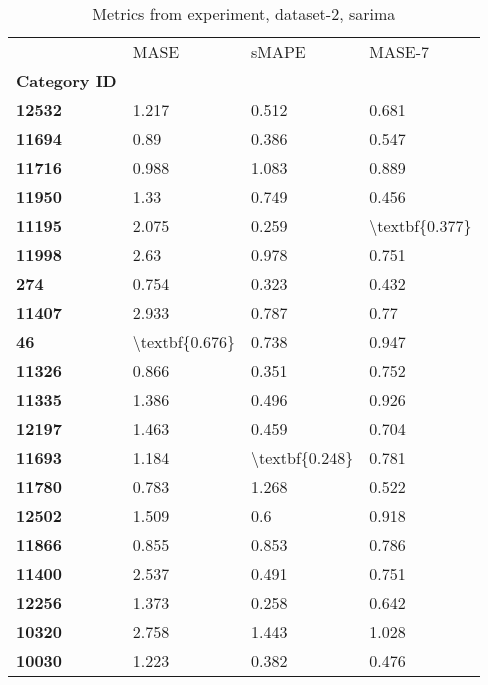 \begin{table}[h]
\centering
\caption{Metrics from experiment, dataset-2, sarima}
\label{table:sarima-dataset-2}
\begin{tabular}{llll}
\toprule
{} &            MASE &           sMAPE &          MASE-7 \\
\textbf{Category ID} &                 &                 &                 \\
\midrule
\textbf{12532      } &           1.217 &           0.512 &           0.681 \\
\textbf{11694      } &            0.89 &           0.386 &           0.547 \\
\textbf{11716      } &           0.988 &           1.083 &           0.889 \\
\textbf{11950      } &            1.33 &           0.749 &           0.456 \\
\textbf{11195      } &           2.075 &           0.259 &  \textbackslash textbf\{0.377\} \\
\textbf{11998      } &            2.63 &           0.978 &           0.751 \\
\textbf{274        } &           0.754 &           0.323 &           0.432 \\
\textbf{11407      } &           2.933 &           0.787 &            0.77 \\
\textbf{46         } &  \textbackslash textbf\{0.676\} &           0.738 &           0.947 \\
\textbf{11326      } &           0.866 &           0.351 &           0.752 \\
\textbf{11335      } &           1.386 &           0.496 &           0.926 \\
\textbf{12197      } &           1.463 &           0.459 &           0.704 \\
\textbf{11693      } &           1.184 &  \textbackslash textbf\{0.248\} &           0.781 \\
\textbf{11780      } &           0.783 &           1.268 &           0.522 \\
\textbf{12502      } &           1.509 &             0.6 &           0.918 \\
\textbf{11866      } &           0.855 &           0.853 &           0.786 \\
\textbf{11400      } &           2.537 &           0.491 &           0.751 \\
\textbf{12256      } &           1.373 &           0.258 &           0.642 \\
\textbf{10320      } &           2.758 &           1.443 &           1.028 \\
\textbf{10030      } &           1.223 &           0.382 &           0.476 \\
\bottomrule
\end{tabular}
\end{table}
